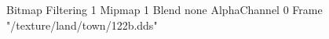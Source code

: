 {Bitmap
	{Filtering 1}
	{Mipmap 1}
	{Blend none}
	{AlphaChannel 0}
	{Frame "/texture/land/town/122b.dds"}
}
